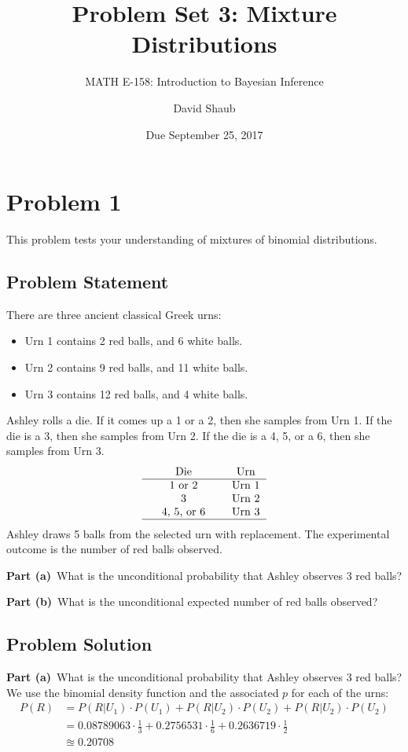 \documentclass[12pt]{article}
\title{Problem Set 3: Mixture Distributions}
\author{MATH E-158: Introduction to Bayesian Inference}
\author{David Shaub}
\date{Due September 25, 2017}
\theoremstyle{definition}
\begin{document}
\maketitle





\section*{Problem 1}

This problem tests your understanding of mixtures of binomial distributions.

\subsection*{Problem Statement}

There are three ancient classical Greek urns:
\begin{itemize}
	\item Urn 1 contains 2 red balls, and 6 white balls.
	\item Urn 2 contains 9 red balls, and 11 white balls.
	\item Urn 3 contains 12 red balls, and 4 white balls.
\end{itemize}
Ashley rolls a die. If it comes up a 1 or a 2, then she samples from Urn 1. If the die is a 3, then she samples from Urn 2. If the die is a 4, 5, or a 6, then she samples from Urn 3.
$$
\begin{tabular}{ccccc}
& Die & & Urn \\
\hline
& 1 or 2 & & Urn 1\\
& 3 & & Urn 2\\
& 4, 5, or 6 & & Urn 3\\
\hline
\end{tabular}
$$
Ashley draws 5 balls from the selected urn with replacement. The experimental outcome is the number of red balls observed.

\bigskip
\noindent
{\bf Part (a)}\ What is the unconditional probability that Ashley observes 3 red balls?

\bigskip
\noindent
{\bf Part (b)}\ What is the unconditional expected number of red balls observed?

\subsection*{Problem Solution}
\noindent
{\bf Part (a)}\ What is the unconditional probability that Ashley observes 3 red balls?\\
We use the binomial density function and the associated $p$ for each of the urns:
\begin{align*}
P(R) &= P(R|U_1)\cdot P(U_1) + P(R|U_2)\cdot P(U_2) + P(R|U_2)\cdot P(U_2)\\
&= 0.08789063 \cdot \frac{1}{3} + 0.2756531 \cdot \frac{1}{6} + 0.2636719 \cdot \frac{1}{2} \\
&\approxeq 0.20708\\
\end{align*}
\end{document}
